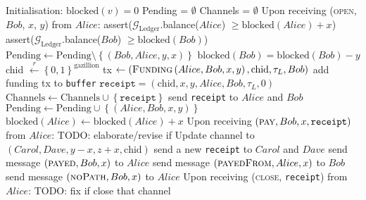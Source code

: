 \begin{algorithm}
  \caption{$\mathcal{F}_{\mathrm{PayNet}}$}
  \label{alg:payfunc}
  \begin{algorithmic}[1]
    \State Initialisation:
      \Indent
        \State $\mathrm{blocked}\left(v\right) = 0$
      \EndFor
      \State Pending = $\emptyset$
      \State Channels = $\emptyset$
      \EndIndent
    \State
    \State Upon receiving (\textsc{open}, $Bob$, $x$, $y$) from $Alice$:
    \Indent
        \State assert($\mathcal{G}_{\mathrm{Ledger}}$.balance($Alice$) $\geq
        \mathrm{blocked}\left(Alice\right) + x$)
        \State assert($\mathcal{G}_{\mathrm{Ledger}}$.balance($Bob$) $\geq
        \mathrm{blocked}\left(Bob\right)$)
        \State $\mathrm{Pending} \leftarrow \mathrm{Pending} \setminus
        \left\{\left(Bob, Alice, y, x\right)\right\}$
        \State $\mathrm{blocked}\left(Bob\right) = \mathrm{blocked}\left(Bob\right) - y$
        \State chid $\overset{r}{\leftarrow} \left\{0, 1\right\}^{\mathrm{gazillion}}$
        \State tx $\gets \left(\textsc{Funding}\left(Alice, Bob, x, y\right),
        \mathrm{chid}, \tau_L, Bob\right)$
        \State add funding tx to \texttt{buffer}
        \State $\mathtt{receipt} = \left(\mathrm{chid}, x, y, Alice, Bob,
        \tau_L, 0\right)$
        \State $\mathrm{Channels} \leftarrow \mathrm{Channels} \cup
        \left\{\mathtt{receipt}\right\}$
        \State send \texttt{receipt} to $Alice$ and $Bob$
      \Else
        \State $\mathrm{Pending} \leftarrow \mathrm{Pending} \cup \left\{\left(Alice, Bob,
        x, y\right)\right\}$
        \State $\mathrm{blocked}\left(Alice\right) \leftarrow
        \mathrm{blocked}\left(Alice\right) + x$
      \EndIf
    \EndIndent
    \State
    \State Upon receiving $\left(\textsc{pay}, Bob, x,
    \vec{\mathtt{receipt}}\right)$ from $Alice$:
    \Indent
        \State TODO: elaborate/revise if
          \State Update channel to $\left(Carol, Dave, y - x, z + x, \mathrm{chid}\right)$
          \State send a new \texttt{receipt} to $Carol$ and $Dave$
        \EndFor
        \State send message $\left(\textsc{payed}, Bob, x\right)$ to $Alice$
        \State send message $\left(\textsc{payedFrom}, Alice, x\right)$ to $Bob$
      \Else
        \State send message $\left(\textsc{noPath}, Bob, x\right)$ to $Alice$
      \EndIf
    \EndIndent
    \State
    \State Upon receiving (\textsc{close}, \texttt{receipt}) from $Alice$:
    \Indent
        \State TODO: fix if
        \State close that channel
      \EndIf
    \EndIndent
  \end{algorithmic}
\end{algorithm}
